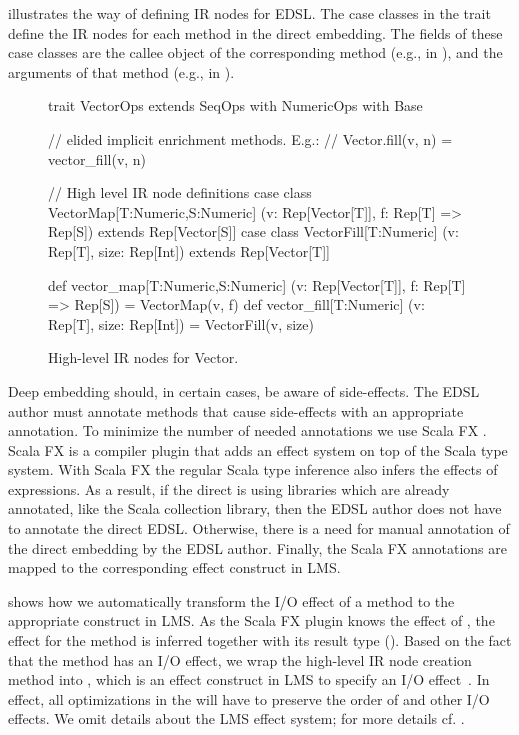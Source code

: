  illustrates the way of defining IR nodes for
 EDSL. The case classes in the  trait define the
IR nodes for each method in the direct embedding. The fields of these case
classes are the callee object of the corresponding method (e.g.,  in
), and the arguments of that method (e.g.,  in
).

\begin{figure}
\begin{listingtiny}
trait VectorOps extends SeqOps with
  NumericOps with Base {
  // elided implicit enrichment methods. E.g.:
  //   Vector.fill(v, n) = vector_fill(v, n)

  // High level IR node definitions
  case class VectorMap[T:Numeric,S:Numeric]
    (v: Rep[Vector[T]], f: Rep[T] => Rep[S])
    extends Rep[Vector[S]]
  case class VectorFill[T:Numeric]
    (v: Rep[T], size: Rep[Int])
    extends Rep[Vector[T]]

  def vector_map[T:Numeric,S:Numeric]
    (v: Rep[Vector[T]], f: Rep[T] => Rep[S]) =
      VectorMap(v, f)
  def vector_fill[T:Numeric]
    (v: Rep[T], size: Rep[Int]) =
    VectorFill(v, size)
}
\end{listingtiny}
\caption{\label{lst:vector_deep_ir} High-level IR nodes for Vector.}
\end{figure}


Deep embedding should, in certain cases, be aware of side-effects. The EDSL
author must annotate methods that cause side-effects with an appropriate
annotation. To minimize the number of needed annotations we use Scala FX
\cite{rytz2012lightweight}. Scala FX is a compiler plugin that adds an effect
system on top of the Scala type system. With Scala FX the regular Scala type
inference also infers the effects of expressions. As a result, if the direct
\edsl is using libraries which are already annotated, like the Scala collection
library, then the EDSL author does not have to annotate the direct EDSL.
Otherwise, there is a need for manual annotation of the direct embedding by
the EDSL author. Finally, the Scala FX annotations are mapped to the
corresponding effect construct in LMS.

 shows how we automatically transform the I/O
effect of a  method to the appropriate construct in LMS. As the
Scala FX plugin knows the effect of , the effect for
the  method is inferred together with its result type
(). Based on the fact that the  method has an I/O
effect, we wrap the high-level IR node creation method into
, which is an effect construct in LMS to specify an I/O
effect~\cite{rompf_building-blocks_2011}. In effect, all optimizations in the \edsl
will have to preserve the order of  and other I/O effects. We omit details
about the LMS effect system; for more details cf. \cite{rompf_building-blocks_2011}.

